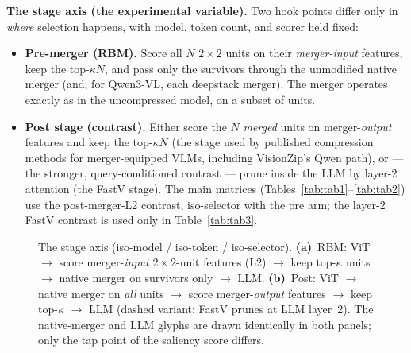 \documentclass[sigconf,review,anonymous]{acmart}
\begin{document}
\textbf{The stage axis (the experimental variable).} Two hook points differ only
in \emph{where} selection happens, with model, token count, and scorer held
fixed:
\begin{itemize}
  \item \textbf{Pre-merger (RBM).} Score all $N$ $2\!\times\!2$ units on their
    \emph{merger-input} features, keep the top-$\kappa N$, and pass only the
    survivors through the unmodified native merger (and, for Qwen3-VL, each
    deepstack merger). The merger operates exactly as in the uncompressed model,
    on a subset of units.
  \item \textbf{Post stage (contrast).} Either score the $N$ \emph{merged} units
    on merger-\emph{output} features and keep the top-$\kappa N$ (the stage used
    by published compression methods for merger-equipped VLMs, including
    VisionZip's Qwen path), or --- the stronger, query-conditioned contrast ---
    prune inside the LLM by layer-2 attention (the FastV stage). The main
    matrices (Tables~\ref{tab:tab1}--\ref{tab:tab2}) use the post-merger-L2
    contrast, iso-selector with the pre arm; the layer-2 FastV contrast is used
    only in Table~\ref{tab:tab3}.
\end{itemize}

\begin{figure}[t]
  \centering
  \caption{The stage axis (iso-model / iso-token / iso-selector).
    \textbf{(a)}~RBM: ViT $\to$ score merger-\emph{input} $2\!\times\!2$-unit
    features (L2) $\to$ keep top-$\kappa$ units $\to$ native merger on survivors
    only $\to$ LLM. \textbf{(b)}~Post: ViT $\to$ native merger on \emph{all}
    units $\to$ score merger-\emph{output} features $\to$ keep top-$\kappa$
    $\to$ LLM (dashed variant: FastV prunes at LLM layer~2). The native-merger
    and LLM glyphs are drawn identically in both panels; only the tap point of
    the saliency score differs.}
  \label{fig:fig1}
\end{figure}
\end{document}
